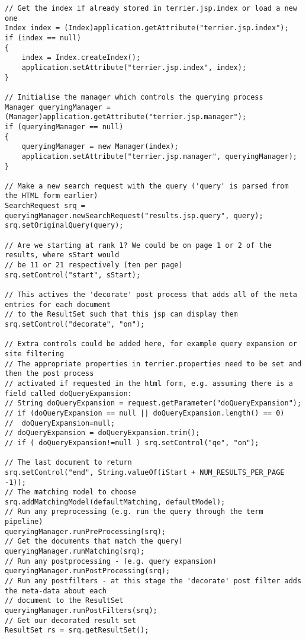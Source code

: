 \begin{verbatim}
// Get the index if already stored in terrier.jsp.index or load a new one
Index index = (Index)application.getAttribute("terrier.jsp.index");
if (index == null)
{
    index = Index.createIndex();
    application.setAttribute("terrier.jsp.index", index);
}

// Initialise the manager which controls the querying process   
Manager queryingManager = (Manager)application.getAttribute("terrier.jsp.manager");
if (queryingManager == null)
{
    queryingManager = new Manager(index);
    application.setAttribute("terrier.jsp.manager", queryingManager);
}

// Make a new search request with the query ('query' is parsed from the HTML form earlier)
SearchRequest srq = queryingManager.newSearchRequest("results.jsp.query", query);
srq.setOriginalQuery(query);

// Are we starting at rank 1? We could be on page 1 or 2 of the results, where sStart would
// be 11 or 21 respectively (ten per page)
srq.setControl("start", sStart);

// This actives the 'decorate' post process that adds all of the meta entries for each document
// to the ResultSet such that this jsp can display them
srq.setControl("decorate", "on");

// Extra controls could be added here, for example query expansion or site filtering
// The appropriate properties in terrier.properties need to be set and then the post process
// activated if requested in the html form, e.g. assuming there is a field called doQueryExpansion:
// String doQueryExpansion = request.getParameter("doQueryExpansion");
// if (doQueryExpansion == null || doQueryExpansion.length() == 0)
//  doQueryExpansion=null;
// doQueryExpansion = doQueryExpansion.trim();
// if ( doQueryExpansion!=null ) srq.setControl("qe", "on");

// The last document to return
srq.setControl("end", String.valueOf(iStart + NUM_RESULTS_PER_PAGE -1));
// The matching model to choose
srq.addMatchingModel(defaultMatching, defaultModel);
// Run any preprocessing (e.g. run the query through the term pipeline)
queryingManager.runPreProcessing(srq);
// Get the documents that match the query)
queryingManager.runMatching(srq);
// Run any postprocessing - (e.g. query expansion)
queryingManager.runPostProcessing(srq);
// Run any postfilters - at this stage the 'decorate' post filter adds the meta-data about each
// document to the ResultSet
queryingManager.runPostFilters(srq);
// Get our decorated result set
ResultSet rs = srq.getResultSet();
\end{verbatim}

